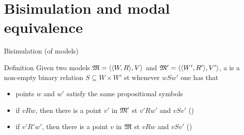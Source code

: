 \documentclass{beamer}
\begin{document}
\section{Bisimulation and modal equivalence}
\begin{slide}{Bisimulation (of models)}\label{s:29}
\small
\begin{block}{Definition}
Given two models $\mathfrak{M} = \mathopen{\langle}\mathopen{\langle}W, R\mathclose{\rangle}, V\mathclose{\rangle}$ and $\mathfrak{M}' = \mathopen{\langle}\mathopen{\langle}W', R'\mathclose{\rangle}, V'\mathclose{\rangle}$, a  is a non-empty binary relation
$S \subseteq W \times W'$  st whenever $w S w'$ one has that
\begin{itemize}
\item points $w$ and $w'$ satisfy the same propositional symbols
\item if $v R w$, then there is a point $v'$ in $\mathfrak{M}'$ st  $v' R w'$ and $v S v'$ \hspace{0.3cm} ()
\item if $v' R' w'$, then there is a point $v$ in $\mathfrak{M}$ st  $v R w$ and $v S v'$ \hspace{0.3cm} ()
\end{itemize}
\end{block}
\end{slide}

\end{document}
